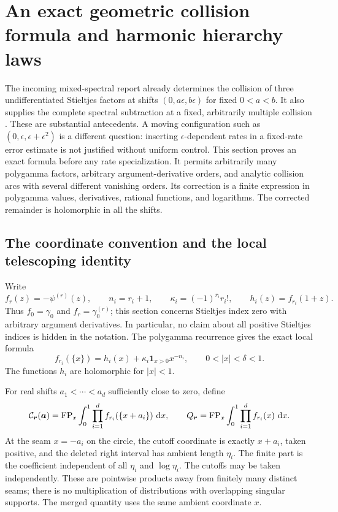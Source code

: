 \section{An exact geometric collision formula and harmonic hierarchy laws}
\label{hc:section}

The incoming mixed-spectral report already determines the collision of
three undifferentiated Stieltjes factors at shifts $(0,a\epsilon,b\epsilon)$
for fixed $0<a<b$. It also supplies the complete spectral subtraction
at a fixed, arbitrarily multiple collision \cite{RepoMixed}. These are
substantial antecedents. A moving configuration such as
$(0,\epsilon,\epsilon+\epsilon^2)$ is a different question: inserting
$\epsilon$-dependent rates in a fixed-rate error estimate is not justified
without uniform control. This section proves an exact formula before
any rate specialization. It permits arbitrarily many polygamma factors,
arbitrary argument-derivative orders, and analytic collision arcs with
several different vanishing orders. Its correction is a finite expression
in polygamma values, derivatives, rational functions, and logarithms.
The corrected remainder is holomorphic in all the shifts.

\subsection{The coordinate convention and the local telescoping identity}

Write
\[
 f_r(z)=-\psi^{(r)}(z),\qquad
 n_i=r_i+1,\qquad \kappa_i=(-1)^{r_i}r_i!,\qquad
 h_i(z)=f_{r_i}(1+z).
\]
Thus $f_0=\gamma_0$ and $f_r=\gamma_0^{(r)}$; this section concerns
Stieltjes index zero with arbitrary argument derivatives. In particular,
no claim about all positive Stieltjes indices is hidden in the notation.
The polygamma recurrence \cite{DLMFPolygamma} gives the exact local formula
\begin{equation}\label{hc:one-sided}
 f_{r_i}(\{x\})=h_i(x)+
       \kappa_i\mathbf1_{x>0}x^{-n_i},\qquad 0<|x|<\delta<1.
\end{equation}
The functions $h_i$ are holomorphic for $|x|<1$.

For real shifts $a_1<\cdots<a_d$ sufficiently close to zero, define
\begin{equation}\label{hc:Cdef}
 \mathcal C_{\boldsymbol r}(\boldsymbol a)
 =\operatorname{FP}_x\int_0^1\prod_{i=1}^d f_{r_i}(\{x+a_i\})\,\,\mathrm d x,
 \qquad
 Q_{\boldsymbol r}=\operatorname{FP}_x\int_0^1\prod_{i=1}^d f_{r_i}(x)\,\,\mathrm d x.
\end{equation}
At the seam $x=-a_i$ on the circle, the cutoff coordinate is exactly
$x+a_i$, taken positive, and the deleted right interval has ambient
length $\eta_i$. The finite part is the coefficient independent of all
$\eta_i$ and $\log\eta_i$. The cutoffs may be taken independently.
These are pointwise products away from finitely many distinct seams;
there is no multiplication of distributions with overlapping singular
supports. The merged quantity uses the same ambient coordinate $x$.

